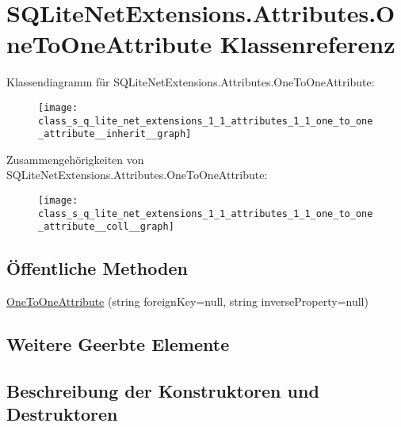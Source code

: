 \hypertarget{class_s_q_lite_net_extensions_1_1_attributes_1_1_one_to_one_attribute}{}\section{S\+Q\+Lite\+Net\+Extensions.\+Attributes.\+One\+To\+One\+Attribute Klassenreferenz}
\label{class_s_q_lite_net_extensions_1_1_attributes_1_1_one_to_one_attribute}


Klassendiagramm für S\+Q\+Lite\+Net\+Extensions.\+Attributes.\+One\+To\+One\+Attribute\+:\nopagebreak
\begin{figure}[H]
\begin{center}
\leavevmode
\texttt{[image: class\_s\_q\_lite\_net\_extensions\_1\_1\_attributes\_1\_1\_one\_to\_one\_attribute\_\_inherit\_\_graph]}
\end{center}
\end{figure}


Zusammengehörigkeiten von S\+Q\+Lite\+Net\+Extensions.\+Attributes.\+One\+To\+One\+Attribute\+:\nopagebreak
\begin{figure}[H]
\begin{center}
\leavevmode
\texttt{[image: class\_s\_q\_lite\_net\_extensions\_1\_1\_attributes\_1\_1\_one\_to\_one\_attribute\_\_coll\_\_graph]}
\end{center}
\end{figure}
\subsection*{Öffentliche Methoden}
\begin{DoxyCompactItemize}
\item 
\mbox{\hyperlink{class_s_q_lite_net_extensions_1_1_attributes_1_1_one_to_one_attribute_ac0e80b6f4ffc7ce4b2bb0d56ce294abd}{One\+To\+One\+Attribute}} (string foreign\+Key=null, string inverse\+Property=null)
\end{DoxyCompactItemize}
\subsection*{Weitere Geerbte Elemente}


\subsection{Beschreibung der Konstruktoren und Destruktoren}
\mbox{\label{class_s_q_lite_net_extensions_1_1_attributes_1_1_one_to_one_attribute_ac0e80b6f4ffc7ce4b2bb0d56ce294abd}} 
